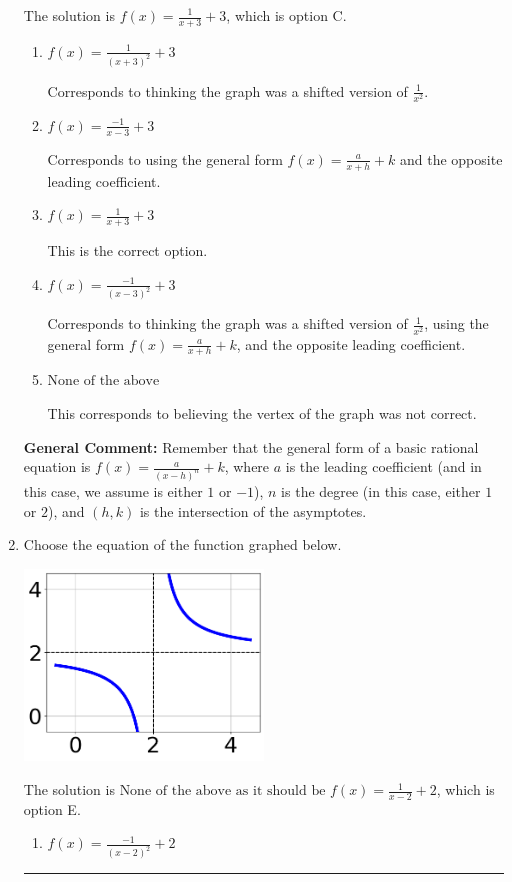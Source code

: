 \documentclass{extbook}[14pt]
\newcommand{\litem}[1]{\item #1

\rule{\textwidth}{0.4pt}}
\begin{document}
\begin{enumerate}
{The solution is \( f(x) = \frac{1}{x + 3} + 3 \), which is option C.\begin{enumerate}[label=\Alph*.]
\item \( f(x) = \frac{1}{(x + 3)^2} + 3 \)

Corresponds to thinking the graph was a shifted version of $\frac{1}{x^2}$.
\item \( f(x) = \frac{-1}{x - 3} + 3 \)

Corresponds to using the general form $f(x) = \frac{a}{x+h}+k$ and the opposite leading coefficient.
\item \( f(x) = \frac{1}{x + 3} + 3 \)

This is the correct option.
\item \( f(x) = \frac{-1}{(x - 3)^2} + 3 \)

Corresponds to thinking the graph was a shifted version of $\frac{1}{x^2}$, using the general form $f(x) = \frac{a}{x+h}+k$, and the opposite leading coefficient.
\item \( \text{None of the above} \)

This corresponds to believing the vertex of the graph was not correct.
\end{enumerate}

\textbf{General Comment:} Remember that the general form of a basic rational equation is $ f(x) = \frac{a}{(x-h)^n} + k$, where $a$ is the leading coefficient (and in this case, we assume is either $1$ or $-1$), $n$ is the degree (in this case, either $1$ or $2$), and $(h, k)$ is the intersection of the asymptotes.
}
\litem{
Choose the equation of the function graphed below.

\begin{center}
    \includegraphics[width=0.5\textwidth]{../Figures/rationalGraphToEquationCopyB.png}
\end{center}


The solution is \( \text{None of the above as it should be } f(x) = \frac{1}{x - 2} + 2 \), which is option E.\begin{enumerate}[label=\Alph*.]
\item \( f(x) = \frac{-1}{(x - 2)^2} + 2 \)


\end{enumerate}}
\end{enumerate}
\end{document}
